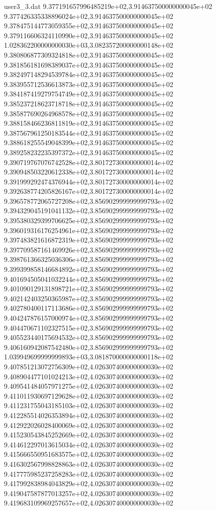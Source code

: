 \begin{filecontents}{user3_3.dat}
9.377191657996485219e+02,3.914637500000000045e+02
9.377426335338896024e+02,3.914637500000000045e+02
9.378475144773059355e+02,3.914637500000000045e+02
9.379116606324110990e+02,3.914637500000000045e+02
1.028362200000000030e+03,3.082357200000000148e+02
9.380806877309324818e+02,3.914637500000000045e+02
9.381856181698389037e+02,3.914637500000000045e+02
9.382497148294539784e+02,3.914637500000000045e+02
9.383955712536613873e+02,3.914637500000000045e+02
9.384187419279754749e+02,3.914637500000000045e+02
9.385237218623718718e+02,3.914637500000000045e+02
9.385877690264968578e+02,3.914637500000000045e+02
9.388158466236811819e+02,3.914637500000000045e+02
9.387567961250183544e+02,3.914637500000000045e+02
9.388618255549048399e+02,3.914637500000000045e+02
9.389258232235397372e+02,3.914637500000000045e+02
9.390719767076742528e+02,3.801727300000000014e+02
9.390948503220612338e+02,3.801727300000000014e+02
9.391999292474376944e+02,3.801727300000000014e+02
9.392638774205826167e+02,3.801727300000000014e+02
9.396578772065727208e+02,3.856902999999999793e+02
9.394329045191041132e+02,3.856902999999999793e+02
9.395380329399706625e+02,3.856902999999999793e+02
9.396019316176254961e+02,3.856902999999999793e+02
9.397483821616872319e+02,3.856902999999999793e+02
9.397709587161469926e+02,3.856902999999999793e+02
9.398761366325036306e+02,3.856902999999999793e+02
9.399399858146684892e+02,3.856902999999999793e+02
9.401694505041032244e+02,3.856902999999999793e+02
9.401090129131898721e+02,3.856902999999999793e+02
9.402142403250365987e+02,3.856902999999999793e+02
9.402780400117113686e+02,3.856902999999999793e+02
9.404247876157000974e+02,3.856902999999999793e+02
9.404470671102327515e+02,3.856902999999999793e+02
9.405523440175694532e+02,3.856902999999999793e+02
9.406160942087542480e+02,3.856902999999999793e+02
1.039949699999999893e+03,3.081870000000000118e+02
9.407851213072756309e+02,4.026307400000000030e+02
9.408904477101024213e+02,4.026307400000000030e+02
9.409541484057971275e+02,4.026307400000000030e+02
9.411011930697129628e+02,4.026307400000000030e+02
9.411231755043185103e+02,4.026307400000000030e+02
9.412285514026353894e+02,4.026307400000000030e+02
9.412922026028400069e+02,4.026307400000000030e+02
9.415230543845252669e+02,4.026307400000000030e+02
9.414612297013615034e+02,4.026307400000000030e+02
9.415666550951683575e+02,4.026307400000000030e+02
9.416302567998828863e+02,4.026307400000000030e+02
9.417775985237258283e+02,4.026307400000000030e+02
9.417992838984043829e+02,4.026307400000000030e+02
9.419047587877013257e+02,4.026307400000000030e+02
9.419683109969257657e+02,4.026307400000000030e+02

\end{filecontents}
